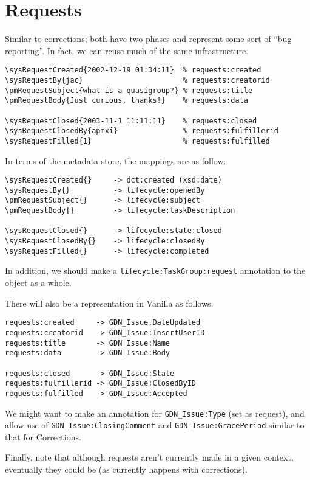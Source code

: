 \documentclass{article}
\begin{document}
\section{Requests}
Similar to corrections; both have two phases and represent
some sort of ``bug reporting''.  In fact, we can reuse
much of the same infrastructure.

\begin{verbatim}
\sysRequestCreated{2002-12-19 01:34:11}  % requests:created
\sysRequestBy{jac}                       % requests:creatorid
\pmRequestSubject{what is a quasigroup?} % requests:title
\pmRequestBody{Just curious, thanks!}    % requests:data

\sysRequestClosed{2003-11-1 11:11:11}    % requests:closed
\sysRequestClosedBy{apmxi}               % requests:fulfillerid
\sysRequestFilled{1}                     % requests:fulfilled
\end{verbatim}

In terms of the metadata store, the mappings are as
follow:

\begin{verbatim}
\sysRequestCreated{}     -> dct:created (xsd:date)
\sysRequestBy{}          -> lifecycle:openedBy
\pmRequestSubject{}      -> lifecycle:subject
\pmRequestBody{}         -> lifecycle:taskDescription

\sysRequestClosed{}      -> lifecycle:state:closed
\sysRequestClosedBy{}    -> lifecycle:closedBy
\sysRequestFilled{}      -> lifecycle:completed
\end{verbatim}

In addition, we should make a
\verb|lifecycle:TaskGroup:request| annotation to the
object as a whole.

There will also be a representation in Vanilla as follows.

\begin{verbatim}
requests:created     -> GDN_Issue.DateUpdated
requests:creatorid   -> GDN_Issue:InsertUserID
requests:title       -> GDN_Issue:Name
requests:data        -> GDN_Issue:Body

requests:closed      -> GDN_Issue:State
requests:fulfillerid -> GDN_Issue:ClosedByID
requests:fulfilled   -> GDN_Issue:Accepted
\end{verbatim}

We might want to make an annotation for
\verb|GDN_Issue:Type| (set as request), and allow use of
\verb|GDN_Issue:ClosingComment| and
\verb|GDN_Issue:GracePeriod| similar to that for
Corrections.

Finally, note that although requests aren't currently made
in a given context, eventually they could be (as currently
happens with corrections).
\end{document}
